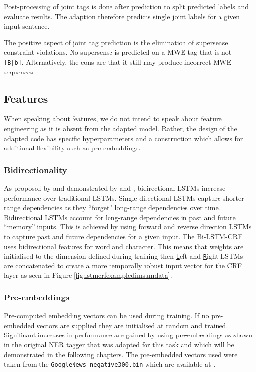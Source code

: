 Post-processing of joint tags is done after prediction to split predicted labels and evaluate results. The adaption therefore predicts single joint labels for a given input sentence.

The positive aspect of joint tag prediction is the elimination of supersense constraint violations. No supersense is predicted on a MWE tag that is not \texttt{[B|b]}. Alternatively, the cons are that it still may produce incorrect MWE sequences. 

\subsection{Features}
When speaking about features, we do not intend to speak about feature engineering as it is absent from the adapted model. Rather, the design of the adapted code has specific hyperparameters and a construction which allows for additional flexibility such as pre-embeddings.

\subsubsection{Bidirectionality}\label{featurebidirectionality}

As proposed by \cite{schuster1997bidirectional} and demonstrated by \cite{Sutskever2014} and \cite{Graves2005}, bidirectional LSTMs increase performance over traditional LSTMs. Single directional LSTMs capture shorter-range dependencies as they ``forget'' long-range dependencies over time. Bidirectional LSTMs account for long-range dependencies in past and future ``memory'' inputs. This is achieved by using forward and reverse direction LSTMs to capture past and future dependencies for a given input. 
The Bi-LSTM-CRF uses bidirectional features for word and character. This means that weights are initialised to the dimension defined during training then \texttt{\underline{L}}eft and \texttt{\underline{R}}ight LSTMs are concatenated to create a more temporally robust input vector for the CRF layer as seen in Figure \ref{fig:lstmcrfexampledimsumdata}.

\subsubsection{Pre-embeddings}

Pre-computed embedding vectors can be used during training. If no pre-embedded vectors are supplied they are initialised at random and trained. Significant increases in performance are gained by using pre-embeddings as shown in the original NER tagger that was adapted for this task \cite{Lample2016} and which will be demonstrated in the following chapters. The pre-embedded vectors used were taken from the \texttt{GoogleNews-negative300.bin} which are available at \cite{word2vecgooglecodeweb}.

